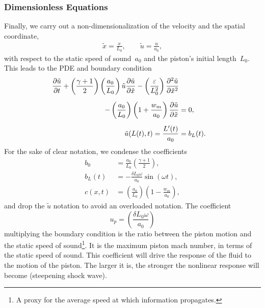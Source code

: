 \documentclass[../../thesis.tex]{subfiles}
\begin{document}
\subsubsection{Dimensionless Equations}
Finally, we carry out a non-dimensionalization of the velocity and the spatial coordinate,
\begin{subequations}
    \begin{align}
        \tilde{x} = \frac{x}{L_0}, \qquad \tilde{u} = \frac{u}{a_0},
    \end{align}
\end{subequations}
with respect to the static speed of sound~$a_0$ and the piston's initial length~$L_0$.
This leads to the PDE and boundary condition
\begin{subequations}
    \begin{align}
        \pdv{\tilde{u}}{t} 
        + \left(\frac{\gamma+1}{2}\right)\left(\frac{a_0}{L_0}\right) \tilde{u} \pdv{\tilde{u}}{\tilde{x}}
        - \left(\frac{\varepsilon}{L_0^2}\right) \pdv[2]{\tilde{u}}{\tilde{x}}
        \nonumber
        \\[2mm]
        - \left(\frac{a_0}{L_0}\right)\left(1 + \frac{w_m}{a_0}\right)\pdv{\tilde{u}}{\tilde{x}}
         &= 0, 
        \\[2mm]
        \tilde{u}(L(t),t) = \frac{L'(t)}{a_0} &= b_L(t).
    \end{align}    
\end{subequations}
For the sake of clear notation, we condense the coefficients 
\begin{subequations}
    \begin{align}
        b_0    &= \frac{a_0}{L_0} \left(\frac{\gamma+1}{2}\right), 
        \\[2mm]
        b_L(t) &= - \frac{\delta L_0 \omega}{a_0} \sin(\omega t),
        \\[2mm]
        c(x,t) &= \left(\frac{a_0}{L_0}\right)\left(1 - \frac{w_m}{a_0}\right),
    \end{align}
\end{subequations}
and drop the $\tilde{u}$ notation to avoid an overloaded notation.
The coefficient 
\begin{equation}
    u_p = \left(\frac{\delta L_0 \omega}{a_0}\right)    
\end{equation}
multiplying the boundary condition
is the ratio between the piston motion and the static speed of sound\footnote{
    A proxy for the average speed at which information propagates.
    }.
It is the maximum piston mach number, in terms of the static speed of sound.
This coefficient will drive the response of the fluid 
to the motion of the piston.
The larger it is, 
the stronger the nonlinear response will become (steepening shock wave). 
\end{document}

